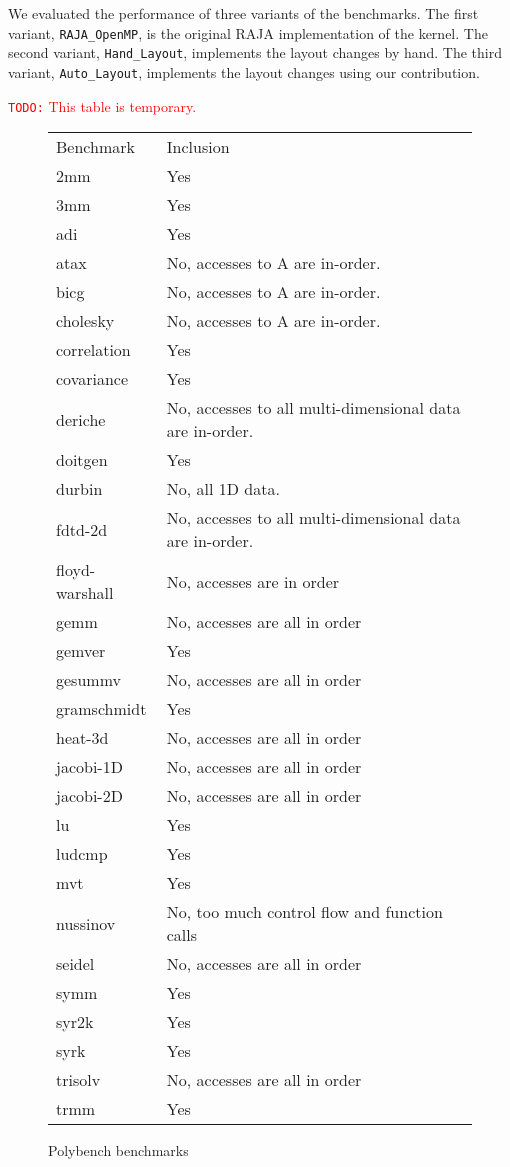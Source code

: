 \documentclass[sigconf, table]{acmart}
\newcommand{\todo}[1]{{\textcolor{red}{{\tt{TODO:}}\,\,#1 }}}
\begin{document}
We evaluated the performance of three variants of the benchmarks.
The first variant, \verb.RAJA_OpenMP., is the original RAJA implementation of the kernel.
The second variant, \verb.Hand_Layout., implements the layout changes by hand.
The third variant, \verb.Auto_Layout., implements the layout changes using our contribution.



\todo{This table is temporary.}
\begin{figure*}
\begin{tabular}{ll}
Benchmark   & Inclusion \\
2mm         & Yes          \\
3mm         & Yes          \\
adi         & Yes          \\
atax        & No, accesses to A are in-order.          \\
bicg        & No, accesses to A are in-order.          \\
cholesky    & No, accesses to A are in-order.          \\
correlation & Yes          \\
covariance  & Yes          \\
deriche     & No, accesses to all multi-dimensional data are in-order.          \\
doitgen     & Yes          \\
durbin      & No, all 1D data.          \\
fdtd-2d     & No, accesses to all multi-dimensional data are in-order.           \\
floyd-warshall & No, accesses are in order \\
gemm        &  No, accesses are all in order         \\
gemver      & Yes          \\
gesummv     & No, accesses are all in order          \\
gramschmidt & Yes          \\
heat-3d     & No, accesses are all in order            \\
jacobi-1D   & No, accesses are all in order           \\
jacobi-2D   & No, accesses are all in order           \\
lu          & Yes         \\
ludcmp      & Yes          \\
mvt         & Yes          \\
nussinov    & No, too much control flow and function calls          \\
seidel      & No, accesses are all in order           \\
symm        & Yes          \\
syr2k       & Yes          \\
syrk        & Yes          \\
trisolv     & No, accesses are all in order           \\
trmm        & Yes         
\end{tabular}
\caption{Polybench benchmarks}
\end{figure*}
\end{document}
